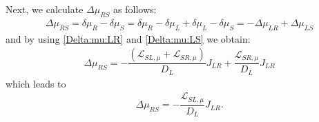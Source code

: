 Next, we calculate $\Delta\mu_{RS}$ as follows:
\begin{align*}
\Delta\mu_{RS}=\delta\mu_{R}-\delta\mu_{S}
=
\delta\mu_{R}-\delta\mu_{L}+\delta\mu_{L}-\delta\mu_{S}
=
-\Delta\mu_{LR}+\Delta\mu_{LS}
\end{align*}
and by using \eqref{Delta:mu:LR} and \eqref{Delta:mu:LS} we obtain:
\begin{align*}
\Delta\mu_{RS}
=
-\dfrac{(\mathcal{L}_{SL,\mu}+\mathcal{L}_{SR,\mu})}{D_{L}}J_{LR}+\dfrac{\mathcal{L}_{SR,\mu}}{D_{L}}J_{LR}
\end{align*}
which leads to 
\begin{align}\label{Delta:mu:RS}
\Delta\mu_{RS}
=
-\dfrac{\mathcal{L}_{SL,\mu}}{D_{L}}J_{LR}.
\end{align}